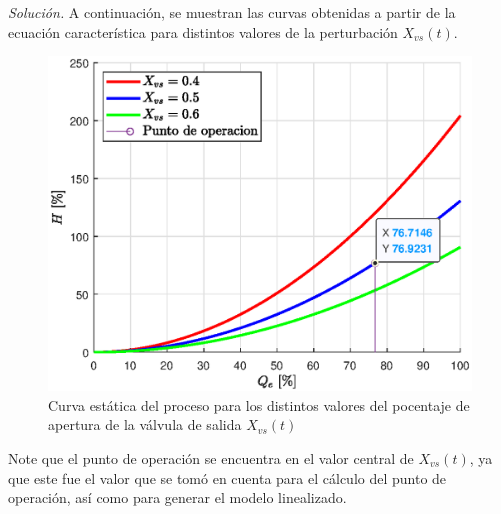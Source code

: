 \textit{Solución.} A continuación, se muestran las curvas obtenidas a partir de la ecuación característica para distintos valores de la perturbación $X _{vs} (t)$.

\begin{figure}[!h]
    \centering
    \includegraphics[width = 0.5\linewidth]{figs/fig6.eps}
    \caption{Curva estática del proceso para los distintos valores del pocentaje de apertura de la válvula de salida $X _{vs} (t)$}
    \label{fig5}
\end{figure}

Note que el punto de operación se encuentra en el valor central de $X _{vs} (t)$, ya que este fue el valor que se tomó en cuenta para el cálculo del punto de operación, así como para generar el modelo linealizado.

